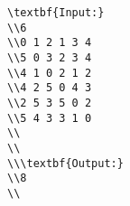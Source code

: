 \begin{verbatim}
\textbf{Input:}
\\6
\\0 1 2 1 3 4 
\\5 0 3 2 3 4 
\\4 1 0 2 1 2 
\\4 2 5 0 4 3 
\\2 5 3 5 0 2 
\\5 4 3 3 1 0 
\\
\\
\\\textbf{Output:}
\\8
\\\end{verbatim}